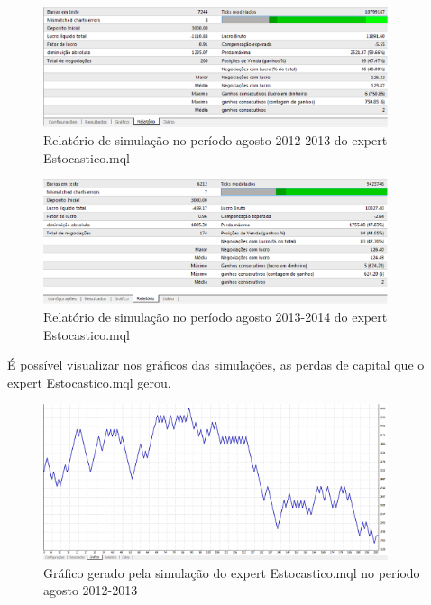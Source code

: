 \begin{figure}[H]
\centering
\includegraphics[width=0.9\textwidth]{figuras/protocoloEst}
\caption{Relatório de simulação no período agosto 2012-2013 do expert Estocastico.mql}
\label{protocoloEst}
\end{figure}

\begin{figure}[H]
\centering
\includegraphics[width=0.9\textwidth]{figuras/protocoloEst2}
\caption{Relatório de simulação no período agosto 2013-2014 do expert Estocastico.mql}
\label{protocoloEst2}
\end{figure}

É possível visualizar nos gráficos das simulações, as perdas de capital que o expert Estocastico.mql gerou.

\begin{figure}[H]
\centering
\includegraphics[width=0.9\textwidth]{figuras/protocoloEst3}
\caption{Gráfico gerado pela simulação do expert Estocastico.mql no período agosto 2012-2013} 
\label{protocoloEst3}
\end{figure}

